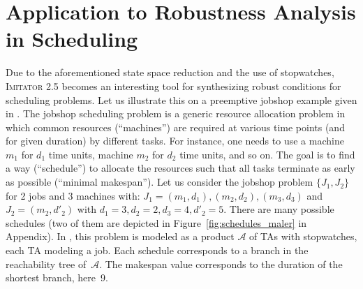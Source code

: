 \documentclass{llncs}
\newcommand{\A}{\mathcal{A}}
\newcommand{\imitator}{\textsc{Imitator}}
\begin{document}
\section{Application to Robustness Analysis in  Scheduling}

Due to the aforementioned state space reduction and the use of stopwatches, \imitator{} 2.5 becomes an interesting tool for synthesizing robust conditions for scheduling problems.
Let us illustrate this on a preemptive jobshop example given in \cite{AM02}.
The jobshop scheduling problem is a generic resource allocation problem in which common resources (``machines'') are required at various time points (and for given duration) by different tasks.
For instance, one needs to use a machine $m_1$ for $d_1$ time units, machine $m_2$ for $d_2$ time units, and so on.
The goal is to find a way (``schedule'') to allocate the resources such that all tasks terminate as early as possible (``minimal makespan'').
%
Let us consider the jobshop problem $\{J_1, J_2\}$ for 2 jobs and 3 machines  with: $J_1 = (m_1,d_1), (m_2,d_2),(m_3,d_3)$ and $J_2 = (m_2,d'_2)$ with $d_1 = 3, d_2=2, d_3=4, d'_2 = 5$.
There are many possible schedules (two of them are depicted in Figure~\ref{fig:schedules_maler} in Appendix). 
%
In  \cite{AM02}, this problem is modeled as a product $\A$ of TAs with stopwatches, each TA modeling a job.
Each schedule corresponds to a branch in the reachability tree of~$\A$.
The makespan value corresponds to the
duration of the shortest branch, here~9.
% 
\end{document}

